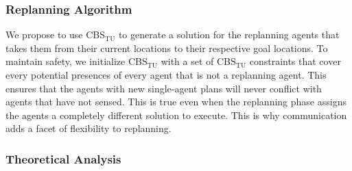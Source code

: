 \documentclass[jair,twoside,11pt,theapa]{article}
\newcommand{\cbstu}{CBS$\mathrm{_{TU}}$\xspace}
\begin{document}
\subsubsection{Replanning Algorithm}



We propose to use \cbstu to generate a solution for the replanning agents that takes them from their current locations to their respective goal locations.  
To maintain safety, we initialize \cbstu with a set of \cbstu constraints that cover every potential presences of every agent that is not a replanning agent. This ensures that the agents with new single-agent plans will never conflict with agents that have not sensed.  
This is true even when the replanning phase assigns the agents a completely different solution to execute. This is why communication adds a facet of flexibility to replanning. 









\subsubsection{Theoretical Analysis}
\end{document}
